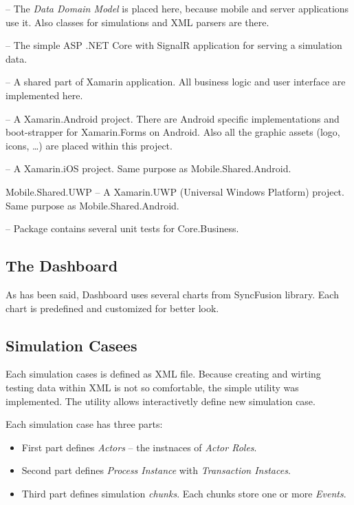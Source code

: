\begin{description}
\item[Core.Business] -- The \textit{Data Domain Model} is placed here, because mobile and server applications use it. Also classes for simulations and XML parsers are there.
\item[Server] -- The simple ASP .NET Core with SignalR application for serving a simulation data.
\item[Mobile.Shared] -- A shared part of Xamarin application. All business logic and user interface are implemented here.
\item[Mobile.Shared.Android] -- A Xamarin.Android project. There are Android specific implementations and boot-strapper for Xamarin.Forms on Android. Also all the graphic assets (logo, icons, \dots) are placed within this project.
\item[Mobile.Shared.iOS] -- A Xamarin.iOS project. Same purpose as Mobile.Shared.Android.
\item{Mobile.Shared.UWP} -- A Xamarin.UWP (Universal Windows Platform) project. Same purpose as Mobile.Shared.Android.
\item[Tests] -- Package contains several unit tests for Core.Business. 
\end{description}
\subsection{The Dashboard}
As has been said, Dashboard uses several charts from SyncFusion library. Each chart is predefined and customized for better look. 
\subsection{Simulation Casees}
Each simulation cases is defined as XML file. Because creating and wirting testing data within XML is not so comfortable, the simple utility was implemented. The utility allows interactivetly define new simulation case.

Each simulation case has three parts:
\begin{itemize}
\item First part defines \textit{Actors} -- the instnaces of \textit{Actor Roles}.
\item Second part defines \textit{Process Instance} with \textit{Transaction Instaces}.
\item Third part defines simulation \textit{chunks}. Each chunks store one or more \textit{Events}.
\end{itemize}

